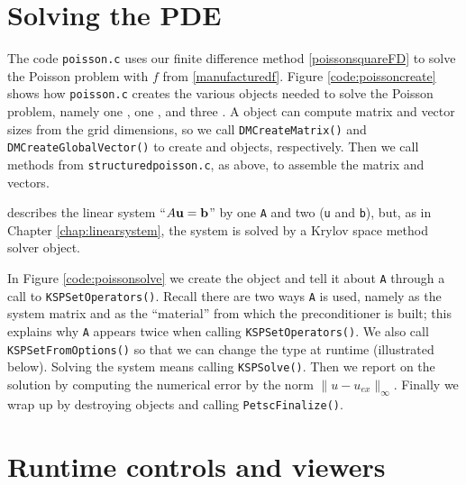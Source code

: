 

\section{Solving the PDE}

The code \texttt{poisson.c} uses our finite difference method \eqref{poissonsquareFD} to solve the Poisson problem with $f$ from \eqref{manufacturedf}.  Figure \ref{code:poissoncreate} shows how \texttt{poisson.c} creates the various objects needed to solve the Poisson problem, namely one \pDM, one \pMat, and three \pVecs.  A \pDM object can compute matrix and vector sizes from the grid dimensions, so we call \texttt{DMCreateMatrix()} and \texttt{DMCreateGlobalVector()} to create \pMat and \pVec objects, respectively.  Then we call methods from \texttt{structuredpoisson.c}, as above, to assemble the matrix and vectors.

\PETSc describes the linear system ``$A\mathbf{u}=\mathbf{b}$'' by one \pMat \texttt{A} and two \pVecs (\texttt{u} and \texttt{b}), but, as in Chapter \ref{chap:linearsystem}, the system is solved by a \pKSP Krylov space method solver object.

In Figure \ref{code:poissonsolve} we create the \pKSP object and tell it about \texttt{A} through a call to \texttt{KSPSetOperators()}.  Recall there are two ways \texttt{A} is used, namely as the system matrix and as the ``material'' from which the preconditioner is built; this explains why \texttt{A} appears twice when calling \texttt{KSPSetOperators()}.  We also call \texttt{KSPSetFromOptions()} so that we can change the \pKSP type at runtime (illustrated below).  Solving the system means calling \texttt{KSPSolve()}.  Then we report on the solution by computing the numerical error by the norm $\|u-u_{ex}\|_\infty$.  Finally we wrap up by destroying objects and calling \texttt{PetscFinalize()}.



\section{Runtime controls and viewers}

